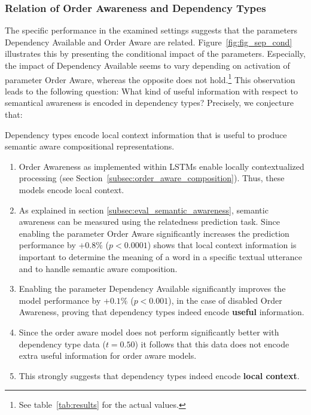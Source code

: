 \subsubsection{Relation of Order Awareness and Dependency Types}
The specific performance in the examined settings suggests that the parameters Dependency Available and Order Aware are related. Figure~\ref{fig:fig_sep_cond} illustrates this by presenting the conditional impact of the parameters. Especially, the impact of Dependency Available seems to vary depending on activation of parameter Order Aware, whereas the opposite does not hold.\footnote{See table~\ref{tab:results} for the actual values.} This observation leads to the following question: What kind of useful information with respect to semantical awareness is encoded in dependency types? Precisely, we conjecture %
that:

\begin{conjecture}
	Dependency types encode local context information that is useful to produce semantic aware compositional representations.
\end{conjecture}	
\begin{rationale}
	\begin{enumerate}
		\item Order Awareness as implemented within \ac{LSTM}s enable locally contextualized processing (see Section~\ref{subsec:order_aware_composition}). Thus, these models encode local context.
		\item As explained in section \ref{subsec:eval_semantic_awareness}, semantic awareness can be measured using the relatedness prediction task. Since enabling the parameter Order Aware significantly increases the prediction performance by $+0.8\%$ ($p < 0.0001$) shows that local context information is important to determine the meaning of a word in a specific textual utterance and to handle semantic aware composition.
		\item Enabling the parameter Dependency Available significantly improves the model performance by $+0.1\%$ ($p < 0.001$), in the case of disabled Order Awareness, proving that dependency types indeed encode \textbf{useful} information.
		\item Since the order aware model does not perform significantly better with dependency type data ($t = 0.50$) it follows that this data does not encode extra useful information for order aware models.
		\item This strongly suggests that dependency types indeed encode \textbf{local context}.
	\end{enumerate}
\end{rationale}

